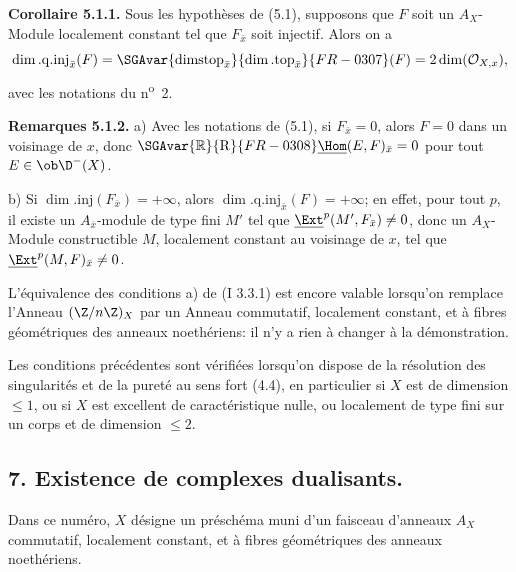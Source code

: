 \textbf{Corollaire 5.1.1.} Sous les hypothèses de (5.1), supposons que $F$ soit un $A_X$-Module localement constant tel que $F_{\bar{x}}$ soit injectif. Alors on a
\[
        \dim.\mathrm{q.inj}_{\bar{x}}(F)=\SGAvar{\operatorname{dimstop}_{\bar{x}}}{\dim.\mathrm{top}_{\bar{x}}}{FR-0307}(F)=2\dim(\mathcal{O}_{X,x}),
\]
avec les notations du n\textsuperscript{o}~2.

\textbf{Remarques 5.1.2.} a) Avec les notations de (5.1), si $F_{\bar{x}}=0$, alors $F=0$ dans un voisinage de $x$, donc $\SGAvar{\mathbb{R}}{\mathrm{R}}{FR-0308}\underline{\Hom}(E,F)_{\bar{x}}=0$ pour tout $E\in\ob\D^{-}(X)$.

b) Si $\dim.\mathrm{inj}(F_{\bar{x}})=+\infty$, alors $\dim.\mathrm{q.inj}_{\bar{x}}(F)=+\infty$; en effet, pour tout $p$, il existe un $A_{\bar{x}}$-module de type fini $M'$ tel que $\underline{\Ext}^p(M',F_{\bar{x}})\neq0$, donc un $A_X$-Module constructible $M$, localement constant au voisinage de $x$, tel que $\underline{\Ext}^p(M,F)_{\bar{x}}\neq0$.


L'équivalence des conditions a) de (I 3.3.1) est encore valable lorsqu'on remplace l'Anneau $(\Z/n\Z)_X$ par un Anneau commutatif, localement constant, et à fibres géométriques des anneaux noethériens: il n'y a rien à changer à la démonstration.

Les conditions précédentes sont vérifiées lorsqu'on dispose de la résolution des singularités et de la pureté au sens fort (4.4), en particulier si $X$ est de dimension $\leq1$, ou si $X$ est excellent de caractéristique nulle, ou localement de type fini sur un corps et de dimension $\leq2$.

\subsection*{7. Existence de complexes dualisants.}

Dans ce numéro, $X$ désigne un préschéma muni d'un faisceau d'anneaux $A_X$ commutatif, localement constant, et à fibres géométriques des anneaux noethériens.

